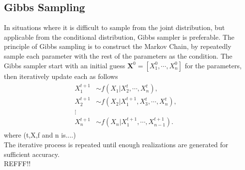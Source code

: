 \subsection{Gibbs Sampling}
In situations where it is difficult to sample from the joint distribution, but applicable from the conditional distribution, Gibbs sampler is preferable. The principle of Gibbs sampling is to construct the Markov Chain, by repeatedly sample each parameter with the rest of the parameters as the condition. The Gibbs sampler start with an initial guess $\boldsymbol{X}^{0}=[X_1^0,\cdots, X_n^0]$ for the parameters, then iteratively update each as follows
\begin{align}
\label{eq:gibbs}
\begin{split}
    X_1^{t+1}& \sim f(X_1|X_2^{t},\cdots,X_n^{t}),\\
    X_2^{t+1}& \sim f(X_2|X_1^{t+1},X_3^{t},\cdots,X_n^{t}),\\
    \vdots \\
    X_n^{t+1}& \sim f(X_n|X_1^{t+1},\cdots,X_{n-1}^{t+1}).
\end{split}
\end{align}
where (t,X,f and n is....)\\
The iterative process is repeated until enough realizations are generated for sufficient accuracy.\\
REFFF!!
\cite[p.~141]{MCMC}\\
\cite[p.~209]{compstat}\\
\cite{GS}\\%
